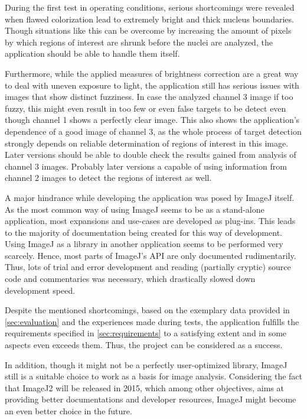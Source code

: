 \documentclass[a4paper, 12pt, twoside]{article}
\begin{document}
During the first test in operating conditions, serious shortcomings were
revealed when flawed colorization lead to extremely bright and thick nucleus
boundaries. Though situations like this can be overcome by increasing the amount
of pixels by which regions of interest are shrunk before the nuclei are
analyzed, the application should be able to handle them itself.

Furthermore, while the applied measures of brightness correction are a great way
to deal with uneven exposure to light, the application still has serious issues
with images that show distinct fuzziness. In case the analyzed channel 3 image
if too fuzzy, this might even result in too few or even false targets to be
detect even though channel 1 shows a perfectly clear image. This also shows the
application's dependence of a good image of channel 3, as the whole process of
target detection strongly depends on reliable determination of regions of
interest in this image. Later versions should be able to double check the
results gained from analysis of channel 3 images. Probably later versions a
capable of using information from channel 2 images to detect the regions of
interest as well.

A major hindrance while developing the application was posed by ImageJ itself.
As the most common way of using ImageJ seems to be as a stand-alone application,
most expansions and use-cases are developed as plug-ins. This leads to the
majority of documentation being created for this way of development. Using
ImageJ as a library in another application seems to be performed very scarcely.
Hence, most parts of ImageJ's API are only documented rudimentarily. Thus, lots
of trial and error development and reading (partially cryptic) source code and
commentaries was necessary, which drastically slowed down development speed.

Despite the mentioned shortcomings, based on the exemplary data provided in
\ref{sec:evaluation} and the experiences made during tests, the application fulfills the requirements
specified in \ref{sec:requirements} to a satisfying extent and in some aspects
even exceeds them. Thus, the project can be considered as a success.

In addition, though it might not be a perfectly user-optimized library, ImageJ
still is a suitable choice to work as a basis for image analysis. Considering
the fact that ImageJ2 will be released in 2015, which among other
objectives, aims at providing better documentations and developer resources,
ImageJ might become an even better choice in the future.
\end{document}
